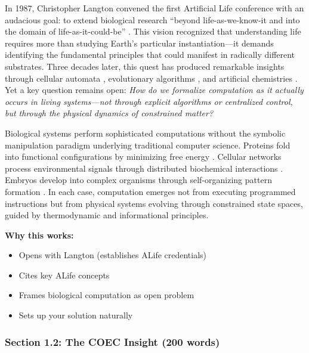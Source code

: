 \documentclass[11pt]{article}
\begin{document}
\begin{tcolorbox}[colback=add!10,colframe=add,title=NEW Opening Paragraph]
In 1987, Christopher Langton convened the first Artificial Life conference with an audacious goal: to extend biological research ``beyond life-as-we-know-it and into the domain of life-as-it-could-be'' \cite{langton1989artificial}. This vision recognized that understanding life requires more than studying Earth's particular instantiation—it demands identifying the fundamental principles that could manifest in radically different substrates. Three decades later, this quest has produced remarkable insights through cellular automata \cite{wolfram2002new}, evolutionary algorithms \cite{holland1992adaptation}, and artificial chemistries \cite{dittrich2001artificial}. Yet a key question remains open: \textit{How do we formalize computation as it actually occurs in living systems—not through explicit algorithms or centralized control, but through the physical dynamics of constrained matter?}

Biological systems perform sophisticated computations without the symbolic manipulation paradigm underlying traditional computer science. Proteins fold into functional configurations by minimizing free energy \cite{anfinsen1973principles}. Cellular networks process environmental signals through distributed biochemical interactions \cite{alon2006introduction}. Embryos develop into complex organisms through self-organizing pattern formation \cite{turing1952chemical}. In each case, computation emerges not from executing programmed instructions but from physical systems evolving through constrained state spaces, guided by thermodynamic and informational principles.
\end{tcolorbox}

\textbf{Why this works:}
\begin{itemize}
    \item Opens with Langton (establishes ALife credentials)
    \item Cites key ALife concepts
    \item Frames biological computation as open problem
    \item Sets up your solution naturally
\end{itemize}

\subsubsection{Section 1.2: The COEC Insight (200 words)}
\end{document}
